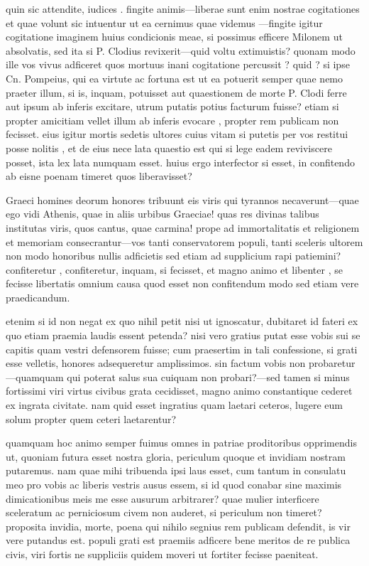  quin sic attendite, iudices . fingite animis—liberae sunt enim nostrae cogitationes et quae volunt sic intuentur ut ea cernimus quae videmus —fingite igitur cogitatione imaginem huius condicionis meae, si possimus efficere Milonem ut absolvatis, sed ita si P. Clodius revixerit—quid voltu extimuistis? quonam modo ille vos vivus adficeret quos mortuus inani cogitatione percussit ? quid ? si ipse Cn. Pompeius, qui ea virtute ac fortuna est ut ea potuerit semper quae nemo praeter illum, si is, inquam, potuisset aut quaestionem de morte P. Clodi ferre aut ipsum ab inferis excitare, utrum putatis potius facturum fuisse? etiam si propter amicitiam vellet illum ab inferis evocare , propter rem publicam non fecisset. eius igitur mortis sedetis ultores cuius vitam si putetis per vos restitui posse nolitis , et de eius nece lata quaestio est qui si lege eadem reviviscere posset, ista lex lata numquam esset. huius ergo interfector si esset, in confitendo ab eisne poenam timeret quos liberavisset?

 Graeci homines deorum honores tribuunt eis viris qui tyrannos necaverunt—quae ego vidi Athenis, quae in aliis urbibus Graeciae! quas res divinas talibus institutas viris, quos cantus, quae carmina! prope ad immortalitatis et religionem et memoriam consecrantur—vos tanti conservatorem populi, tanti sceleris ultorem non modo honoribus nullis adficietis sed etiam ad supplicium rapi patiemini? confiteretur , confiteretur, inquam, si fecisset, et magno animo et libenter , se fecisse libertatis omnium causa quod esset non confitendum modo sed etiam vere praedicandum.

 etenim si id non negat ex quo nihil petit nisi ut ignoscatur, dubitaret id fateri ex quo etiam praemia laudis essent petenda? nisi vero gratius putat esse vobis sui se capitis quam vestri defensorem fuisse; cum praesertim in tali confessione, si grati esse velletis, honores adsequeretur amplissimos. sin factum vobis non probaretur—quamquam qui poterat salus sua cuiquam non probari?—sed tamen si minus fortissimi viri virtus civibus grata cecidisset, magno animo constantique cederet ex ingrata civitate. nam quid esset ingratius quam laetari ceteros, lugere eum solum propter quem ceteri laetarentur?

 quamquam hoc animo semper fuimus omnes in patriae proditoribus opprimendis ut, quoniam futura esset nostra gloria, periculum quoque et invidiam nostram putaremus. nam quae mihi tribuenda ipsi laus esset, cum tantum in consulatu meo pro vobis ac liberis vestris ausus essem, si id quod conabar sine maximis dimicationibus meis me esse ausurum arbitrarer? quae mulier interficere sceleratum ac perniciosum civem non auderet, si periculum non timeret? proposita invidia, morte, poena qui nihilo segnius rem publicam defendit, is vir vere putandus est. populi grati est praemiis adficere bene meritos de re publica civis, viri fortis ne suppliciis quidem moveri ut fortiter fecisse paeniteat.

